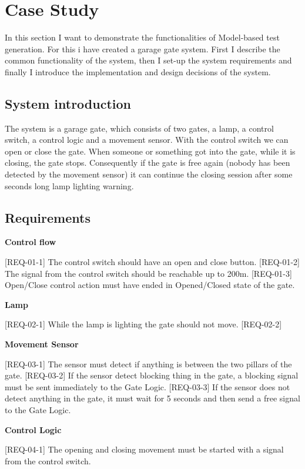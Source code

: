 \chapter{Case Study}\label{sect:case-study}
In this section I want to demonstrate the functionalities of Model-based test generation. For this i have created a garage gate system. First I describe the common functionality of the system, then I set-up the system requirements and finally I introduce the implementation and design decisions of the system.

\section{System introduction}
The system is a garage gate, which consists of two gates, a lamp, a control switch, a control logic and a movement sensor. With the control switch we can open or close the gate. When someone or something got into the gate, while it is closing, the gate stops. Consequently if the gate is free again (nobody has been detected by the movement sensor) it can continue the closing session after some seconds long lamp lighting warning.

\section{Requirements}
\textbf{Control flow}

[REQ-01-1] The control switch should have an open and close button.
[REQ-01-2] The signal from the control switch should be reachable up to 200m.
[REQ-01-3] Open/Close control action must have ended in Opened/Closed state of the gate.

\textbf{Lamp}

[REQ-02-1] While the lamp is lighting the gate should not move.
[REQ-02-2] 

\textbf{Movement Sensor}

[REQ-03-1] The sensor must detect if anything is between the two pillars of the gate.
[REQ-03-2] If the sensor detect blocking thing in the gate, a blocking signal must be sent immediately to the Gate Logic.
[REQ-03-3] If the sensor does not detect anything in the gate, it must wait for 5 seconds and then send a free signal to the Gate Logic.

\textbf{Control Logic}

[REQ-04-1] The opening and closing movement must be started with a signal from the control switch.

